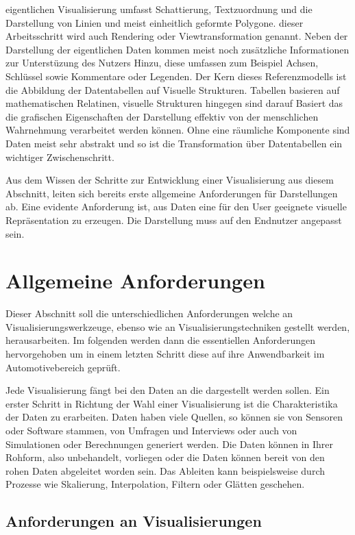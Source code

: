 \documentclass[draft=false
              ,paper=a4
              ,twoside=false
              ,fontsize=11pt
              ,headsepline
              ,BCOR10mm
              ,DIV11
              ]{scrbook}
\begin{document}
eigentlichen Visualisierung umfasst Schattierung, Textzuordnung und die Darstellung von Linien und meist einheitlich geformte Polygone. dieser Arbeitsschritt wird auch Rendering oder Viewtransformation genannt. Neben der Darstellung der eigentlichen Daten kommen meist noch zusätzliche Informationen zur Unterstüzung des Nutzers Hinzu, diese umfassen zum Beispiel Achsen, Schlüssel sowie Kommentare oder Legenden. 
Der Kern dieses Referenzmodells ist die Abbildung der Datentabellen auf Visuelle Strukturen. Tabellen basieren auf mathematischen Relatinen, visuelle Strukturen hingegen sind darauf Basiert das die grafischen Eigenschaften der Darstellung effektiv von der menschlichen Wahrnehmung verarbeitet werden können. Ohne eine räumliche Komponente sind Daten meist sehr abstrakt und so ist die Transformation über Datentabellen ein wichtiger Zwischenschritt.

Aus dem Wissen der Schritte zur Entwicklung einer Visualisierung aus diesem Abschnitt, leiten sich bereits erste allgemeine Anforderungen für Darstellungen ab. Eine evidente Anforderung ist, aus Daten eine für den User geeignete visuelle Repräsentation zu erzeugen. Die Darstellung muss auf den Endnutzer angepasst sein.

\section{Allgemeine Anforderungen} %
\label{sec:allgemeine_anforderungen}

Dieser Abschnitt soll die unterschiedlichen Anforderungen welche an Visualisierungswerkzeuge, ebenso wie an Visualisierungstechniken gestellt werden, herausarbeiten. Im folgenden werden dann die essentiellen Anforderungen hervorgehoben um in einem letzten Schritt diese auf ihre Anwendbarkeit im Automotivebereich geprüft. 

Jede Visualisierung fängt bei den Daten an die dargestellt werden sollen. Ein erster Schritt in Richtung der Wahl einer Visualisierung ist die Charakteristika der Daten zu erarbeiten. Daten haben viele Quellen, so können sie von Sensoren oder Software stammen, von Umfragen und Interviews oder auch von Simulationen oder Berechnungen generiert werden. Die Daten können in Ihrer Rohform, also unbehandelt, vorliegen oder die Daten können bereit von den rohen Daten abgeleitet worden sein. Das Ableiten kann beispielsweise durch Prozesse wie Skalierung, Interpolation, Filtern oder Glätten geschehen.  

\subsection{Anforderungen an Visualisierungen} %
\label{sub:anforderungen_an_visualisierungen}
\end{document}
